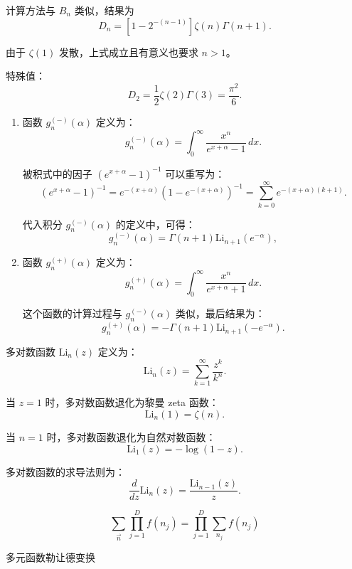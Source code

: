 \begin{defn}
\begin{enumerate}
    计算方法与 \( B_n \) 类似，结果为
    \[
    D_n = [1 - 2^{-(n-1)}] \zeta(n) \Gamma(n+1).
    \]
    
    由于 \(\zeta(1)\) 发散，上式成立且有意义也要求 \( n > 1 \)。
\begin{zhu}
    特殊值：
    \[
    D_2 = \frac{1}{2} \zeta(2) \Gamma(3) = \frac{\pi^2}{6}.
    \]
\end{zhu}
    \end{enumerate}
\end{defn}
\begin{defn}
    \noindent
\begin{enumerate}
\item 
函数 \( g_n^{(-)}(\alpha) \) 定义为：
\[
g_n^{(-)}(\alpha) = \int_0^\infty \frac{x^n}{e^{x+\alpha} - 1} \, dx.
\]

被积式中的因子 \((e^{x+\alpha} - 1)^{-1}\) 可以重写为：
\[
(e^{x+\alpha} - 1)^{-1} = e^{-(x+\alpha)} (1 - e^{-(x+\alpha)})^{-1} = \sum_{k=0}^\infty e^{-(x+\alpha)(k+1)}.
\]

代入积分 \( g_n^{(-)}(\alpha) \) 的定义中，可得：
\[
g_n^{(-)}(\alpha) = \Gamma(n + 1) \text{Li}_{n+1}(e^{-\alpha}),
\]
\item 
函数 \( g_n^{(+)}(\alpha) \) 定义为：
\[
g_n^{(+)}(\alpha) = \int_0^\infty \frac{x^n}{e^{x+\alpha} + 1} \, dx.
\]

这个函数的计算过程与 \( g_n^{(-)}(\alpha) \) 类似，最后结果为：
\[
g_n^{(+)}(\alpha) = -\Gamma(n + 1) \text{Li}_{n+1}(-e^{-\alpha}).
\]
\end{enumerate}
\begin{add}
    多对数函数 \(\text{Li}_n(z)\) 定义为：
    \[
    \text{Li}_n(z) = \sum_{k=1}^\infty \frac{z^k}{k^n}.
    \]
    
    当 \( z = 1 \) 时，多对数函数退化为黎曼 zeta 函数：
    \[
    \text{Li}_n(1) = \zeta(n).
    \]
    
    当 \( n = 1 \) 时，多对数函数退化为自然对数函数：
    \[
    \text{Li}_1(z) = -\log(1 - z).
    \]
    
    多对数函数的求导法则为：
    \[
    \frac{d}{dz} \text{Li}_n(z) = \frac{\text{Li}_{n-1}(z)}{z}.
    \]
\end{add}
\end{defn}
\begin{proposition}
\[
\sum_{\vec{n}} \prod_{j=1}^D f(n_j) = \prod_{j=1}^D \sum_{n_j} f(n_j)
\]
\end{proposition}
\begin{defn}
    多元函数勒让德变换
\end{defn}
